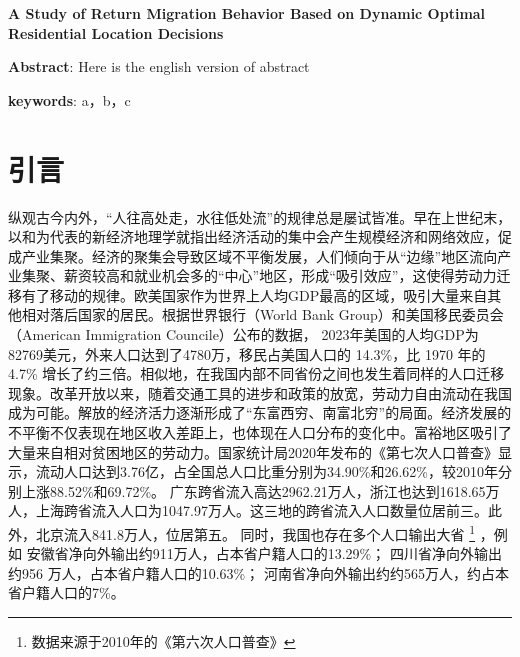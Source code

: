 \documentclass[a4paper, zihao=-4, fontset = mac, oneside]{ctexbook} %
\let\oldfootnote\footnote
\renewcommand{\footnote}[1]{%
  \oldfootnote{\setstretch{1.5}#1}%
}
\begin{document}
\begin{center}
    {
    \textbf{A Study of Return Migration Behavior Based on Dynamic Optimal Residential Location Decisions}
    }
\end{center}

{
\textbf{Abstract}: Here is the english version of abstract

\textbf{keywords}: a，b，c
}



\frontmatter
\renewcommand{\thepage}{\Roman{page}} %

%

\newpage
\tableofcontents
\thispagestyle{empty}

\mainmatter
\newpage
\chapter{引言}

纵观古今内外，“人往高处走，水往低处流”的规律总是屡试皆准。早在上世纪末，以\textcite{krugmanIncreasingReturnsEconomic1991}和\textcite{fujitaSpatialEconomyCities1999}为代表的新经济地理学就指出经济活动的集中会产生规模经济和网络效应，促成产业集聚。经济的聚集会导致区域不平衡发展，人们倾向于从“边缘”地区流向产业集聚、薪资较高和就业机会多的“中心”地区，形成“吸引效应”，这使得劳动力迁移有了移动的规律。欧美国家作为世界上人均GDP最高的区域，吸引大量来自其他相对落后国家的居民。根据世界银行（World Bank Group）和美国移民委员会（American Immigration Councile）公布的数据，
2023年美国的人均GDP为82769美元，外来人口达到了4780万，移民占美国人口的 14.3\%，比 1970 年的 4.7\% 增长了约三倍。相似地，在我国内部不同省份之间也发生着同样的人口迁移现象。改革开放以来，随着交通工具的进步和政策的放宽，劳动力自由流动在我国成为可能。解放的经济活力逐渐形成了“东富西穷、南富北穷”的局面。经济发展的不平衡不仅表现在地区收入差距上，也体现在人口分布的变化中。富裕地区吸引了大量来自相对贫困地区的劳动力。国家统计局2020年发布的《第七次人口普查》显示，流动人口达到3.76亿，占全国总人口比重分别为34.90\%和26.62\%，较2010年分别上涨88.52\%和69.72\%。
广东跨省流入高达2962.21万人，浙江也达到1618.65万人，上海跨省流入人口为1047.97万人。这三地的跨省流入人口数量位居前三。此外，北京流入841.8万人，位居第五。
同时，我国也存在多个人口输出大省\footnote{数据来源于2010年的《第六次人口普查》}，例如
安徽省净向外输出约911万人，占本省户籍人口的13.29\%；
四川省净向外输出约956 万人，占本省户籍人口的10.63\%；
河南省净向外输出约约565万人，约占本省户籍人口的7\%。
\end{document}
